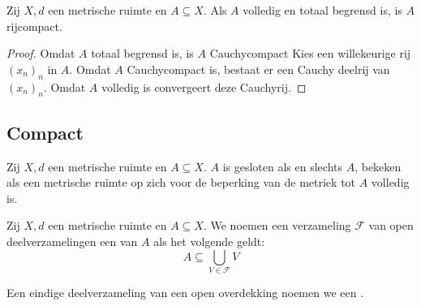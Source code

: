 \documentclass[main.tex]{subfiles}
\begin{document}
\begin{bst}
  \label{st:volledig-en-totaal-begrensd-dan-rijcompact}
  Zij $X,d$ een metrische ruimte en $A \subseteq X$.
  Als $A$ volledig en totaal begrensd is, is $A$ rijcompact.
  
  \begin{proof}
    Omdat $A$ totaal begrensd is, is $A$ Cauchycompact
    Kies een willekeurige rij $(x_{n})_{n}$ in $A$.
    Omdat $A$ Cauchycompact is, bestaat er een Cauchy deelrij van $(x_{n})_{n}$.
    Omdat $A$ volledig is convergeert deze Cauchyrij.
  \end{proof}
\end{bst}

\subsection{Compact}
\label{sec:compact}

\begin{st}
  Zij $X,d$ een metrische ruimte en $A \subseteq X$.
  $A$ is gesloten als en slechts $A$, bekeken als een metrische ruimte op zich voor de beperking van de metriek tot $A$ volledig is.
\end{st}

\begin{de}
  Zij $X,d$ een metrische ruimte en $A \subseteq X$.
  We noemen een verzameling $\mathcal{F}$ van open deelverzamelingen een  van $A$ als het volgende geldt:
  \[ A \subseteq \bigcup_{V \in \mathcal{F}}V \]
\end{de}

\begin{de}
  Een eindige deelverzameling van een open overdekking noemen we een .
\end{de}
\end{document}
